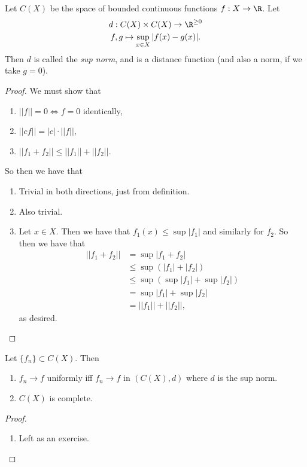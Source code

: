 \documentclass{notes}
\begin{document}
\begin{theorem}
  Let $C(X)$ be the space of bounded continuous functions $f: X \to \R$. Let
  \begin{gather*}
    d: C(X) \times C(X) \to \R^{\geq 0} \\
    f,g \mapsto \sup_{x\in X} |f(x) - g(x)|.
  \end{gather*}
  Then $d$ is called the \emph{sup norm}, and is a distance function (and also a norm, if we
  take $g = 0$).
\end{theorem}
\begin{proof}
  We must show that 
  \begin{enumerate}
    \item $||f|| = 0 \iff f = 0$ identically, 
    \item $||cf|| = |c|\cdot ||f||$, 
    \item $||f_1 + f_2|| \leq ||f_1|| + ||f_2||$.
  \end{enumerate}
  So then we have that 
  \begin{enumerate}
    \item Trivial in both directions, just from definition.
    \item Also trivial.
    \item Let $x\in X$. Then we have that $f_1(x) \leq \sup |f_1|$ and similarly for $f_2$. So then we
      have that 
      \begin{align*}
        ||f_1 + f_2|| &= \sup |f_1 + f_2| \\
                      &\leq \sup \left( |f_1| + |f_2| \right) \\
                      &\leq \sup \left( \sup |f_1| + \sup|f_2| \right) \\
                      &= \sup |f_1| + \sup |f_2|\\
                      &= ||f_1|| + ||f_2||,
      \end{align*}
      as desired.
  \end{enumerate}
\end{proof}

\begin{corollary}
  Let $\{f_n\} \subset C(X).$ Then 
  \begin{enumerate}
    \item $f_n \to f$ uniformly iff $f_n \to f$ in $\left( C(X), d \right)$ where $d$ is the sup
      norm.
    \item $C(X)$ is complete.
  \end{enumerate}
\end{corollary}
\begin{proof}\leavevmode
  \begin{enumerate}
    \item Left as an exercise.
  \end{enumerate}
\end{proof}
\end{document}
